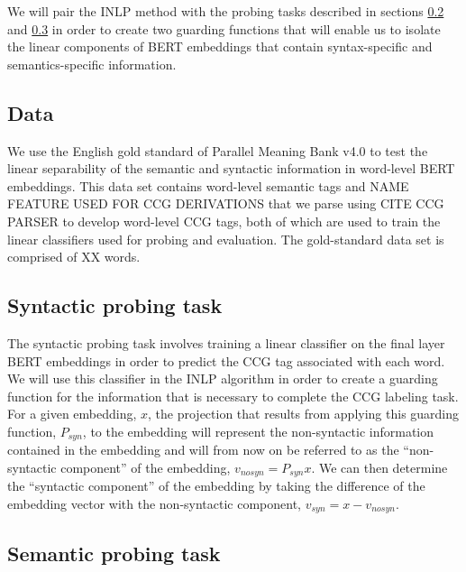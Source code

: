 \documentclass[11pt,a4paper]{article}
\begin{document}
We will pair the INLP method with the probing tasks described in sections \ref{sec:syntactic} and \ref{sec:semantics} in order to create two guarding functions that will enable us to isolate the linear components of BERT embeddings that contain syntax-specific and semantics-specific information. 


\subsection{Data}
\label{sec:data}

We use the English gold standard of Parallel Meaning Bank v4.0 \citep{pmbData} to test the linear separability of the semantic and syntactic information in word-level BERT embeddings. This data set contains word-level semantic tags and NAME FEATURE USED FOR CCG DERIVATIONS %
 that we parse using CITE CCG PARSER %
 to develop word-level CCG tags, both of which are used to train the linear classifiers used for probing and evaluation. The gold-standard data set is comprised of XX words. %


\subsection{Syntactic probing task}
\label{sec:syntactic}

The syntactic probing task involves training a linear classifier on the final layer BERT embeddings in order to predict the CCG tag associated with each word. We will use this classifier in the INLP algorithm in order to create a guarding function for the information that is necessary to complete the CCG labeling task. For a given embedding, $x$, the projection that results from applying this guarding function, $P_{syn}$, to the embedding will represent the non-syntactic information contained in the embedding and will from now on be referred to as the ``non-syntactic component'' of the embedding, $v_{no syn} = P_{syn} x$. We can then determine the ``syntactic component'' of the embedding by taking the difference of the embedding vector with the non-syntactic component, $v_{syn} = x - v_{no syn}$.


\subsection{Semantic probing task}
\label{sec:semantics}
\end{document}
